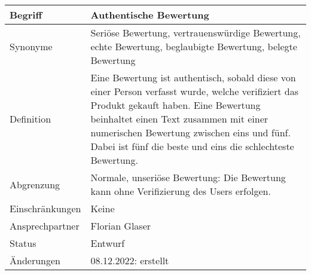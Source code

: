 \begin{table}[H]
    \centering
    \label{gls:authentischeBewertung}
    \begin{tabularx}{\textwidth}{| l | X |}
        \hline
        Begriff         & Authentische Bewertung                                                                                                                                                                                                                                                                          \\
        \hline
        Synonyme        & Seriöse Bewertung, vertrauenswürdige Bewertung, echte Bewertung, beglaubigte Bewertung, belegte Bewertung                                                                                                                                                                                       \\
        \hline
        Definition      & Eine Bewertung ist authentisch, sobald diese von einer Person verfasst wurde, welche verifiziert das Produkt gekauft haben. Eine Bewertung beinhaltet einen Text zusammen mit einer numerischen Bewertung zwischen eins und fünf. Dabei ist fünf die beste und eins die schlechteste Bewertung. \\
        \hline
        Abgrenzung      & Normale, unseriöse Bewertung: Die Bewertung kann ohne Verifizierung des Users erfolgen.                                                                                                                                                                                                         \\
        \hline
        Einschränkungen & Keine                                                                                                                                                                                                                                                                                           \\
        \hline
        Ansprechpartner & Florian Glaser                                                                                                                                                                                                                                                                                  \\
        \hline
        Status          & Entwurf                                                                                                                                                                                                                                                                                         \\
        \hline
        Änderungen      & 08.12.2022: erstellt                                                                                                                                                                                                                                                                            \\
        \hline
    \end{tabularx}
\end{table}

